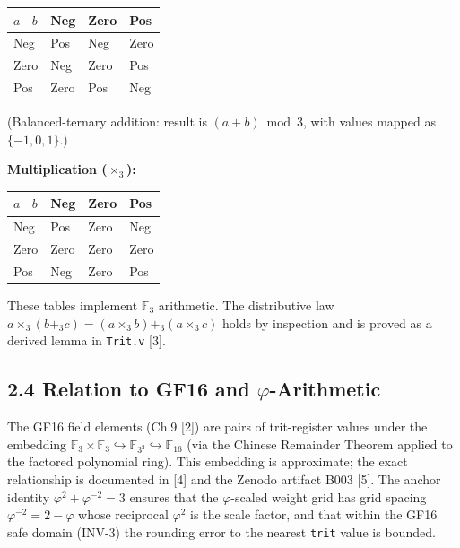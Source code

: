 \begin{longtable}[]{@{}llll@{}}
\toprule\noalign{}
\(a\) ~\(b\) & Neg & Zero & Pos \\
\midrule\noalign{}
\endhead
\bottomrule\noalign{}
\endlastfoot
Neg & Pos & Neg & Zero \\
Zero & Neg & Zero & Pos \\
Pos & Zero & Pos & Neg \\
\end{longtable}

(Balanced-ternary addition: result is
\((a + b) \bmod 3\), with values mapped as
\(\{-1, 0, 1\}\).)

\textbf{Multiplication (\(\times_3\)):}

\begin{longtable}[]{@{}llll@{}}
\toprule\noalign{}
\(a\) ~\(b\) & Neg & Zero & Pos \\
\midrule\noalign{}
\endhead
\bottomrule\noalign{}
\endlastfoot
Neg & Pos & Zero & Neg \\
Zero & Zero & Zero & Zero \\
Pos & Neg & Zero & Pos \\
\end{longtable}

These tables implement \(\mathbb{F}_3\)
arithmetic. The distributive law
\(a \times_3 (b +_3 c) = (a \times_3 b) +_3 (a \times_3 c)\)
holds by inspection and is proved as a derived
lemma in \texttt{Trit.v} [3].

\subsection{\texorpdfstring{2.4 Relation to
GF16 and
\(\varphi\)-Arithmetic}{2.4 Relation to GF16 and \textbackslash varphi-Arithmetic}}\label{fa_27:relation-to-gf16-and-varphi-arithmetic}

The GF16 field elements (Ch.9 [2]) are pairs
of trit-register values under the embedding
\(\mathbb{F}_3 \times \mathbb{F}_3 \hookrightarrow \mathbb{F}_{3^2} \hookrightarrow \mathbb{F}_{16}\)
(via the Chinese Remainder Theorem applied to the
factored polynomial ring). This embedding is
approximate; the exact relationship is documented
in
[4] and the Zenodo artifact B003 [5]. The
anchor identity \(\varphi^2 + \varphi^{-2} = 3\)
ensures that the \(\varphi\)-scaled weight grid
has grid spacing \(\varphi^{-2} = 2 - \varphi\)
whose reciprocal \(\varphi^2\) is the scale
factor, and that within the GF16 safe domain
(INV-3) the rounding error to the nearest
\texttt{trit} value is bounded.

